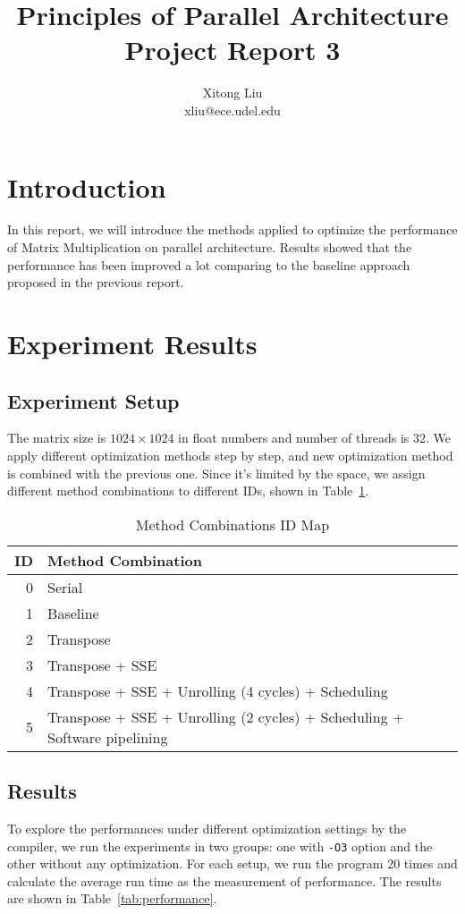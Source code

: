 \documentclass[12pt]{article}
\title{Principles of Parallel Architecture\\
Project Report 3}
\author{Xitong Liu \\
xliu@ece.udel.edu}
\begin{document}
\maketitle

\section{Introduction}
In this report, we will introduce the methods applied to optimize
the performance of Matrix Multiplication on parallel architecture.
Results showed that the performance has been improved a lot comparing
to the baseline approach proposed in the previous report.


\section{Experiment Results}
\subsection{Experiment Setup}
The matrix size is $1024\times 1024$ in float numbers and number of 
threads is 32. We apply different optimization methods step by step, 
and new optimization method is combined with the previous one. Since 
it's limited by the space, we assign different method combinations to 
different IDs, shown in Table~\ref{tab:methods}.

\begin{table}[h!]
	\small
	\begin{center}
	\caption{\label{tab:methods} Method Combinations ID Map}
	\begin{tabular}{|r|l|}
		\hline
		ID & Method Combination \\ \hline
		0 &	Serial \\ \hline
		1 & Baseline \\ \hline
    2 & Transpose \\ \hline
    3 & Transpose + SSE \\ \hline
    4 & Transpose + SSE + Unrolling (4 cycles) + Scheduling \\ \hline
    5 & Transpose + SSE + Unrolling (2 cycles) + Scheduling + 
      Software pipelining \\ \hline
	\end{tabular}
	\end{center}
\end{table}

\subsection{Results}
To explore the performances under different optimization settings by 
the compiler, we run the experiments in two groups: one with 
\texttt{-O3} option and the other without any optimization. For 
each setup, we run the program 20 times and calculate the average 
run time as the measurement of performance. The results are shown in 
Table~\ref{tab:performance}.
\end{document}
